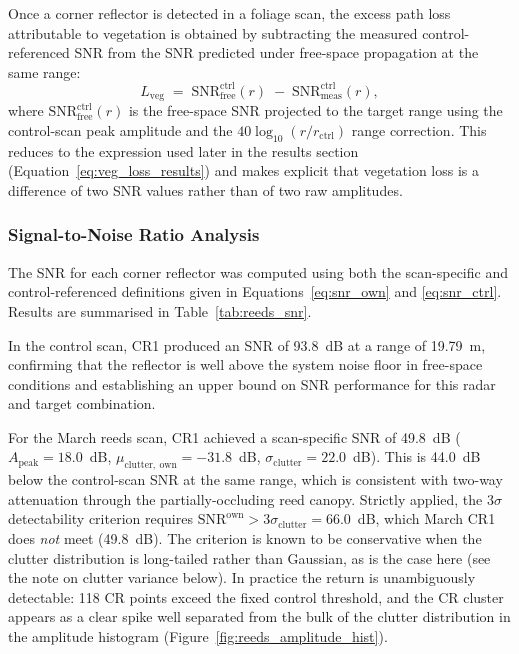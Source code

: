 Once a corner reflector is detected in a foliage scan, the excess path loss
attributable to vegetation is obtained by subtracting the measured
control-referenced SNR from the SNR predicted under free-space propagation at
the same range:
\begin{equation}
    L_{\mathrm{veg}}
    \;=\; \mathrm{SNR}^{\mathrm{ctrl}}_{\mathrm{free}}(r)
          \;-\; \mathrm{SNR}^{\mathrm{ctrl}}_{\mathrm{meas}}(r),
    \label{eq:veg_loss}
\end{equation}
where $\mathrm{SNR}^{\mathrm{ctrl}}_{\mathrm{free}}(r)$ is the free-space SNR
projected to the target range using the control-scan peak amplitude and the
$40\log_{10}(r/r_{\mathrm{ctrl}})$ range correction.
This reduces to the expression used later in the results section
(Equation~\ref{eq:veg_loss_results}) and makes explicit that vegetation loss
is a difference of two SNR values rather than of two raw amplitudes.



\subsubsection{Signal-to-Noise Ratio Analysis}

The SNR for each corner reflector was computed using both the scan-specific
and control-referenced definitions given in
Equations~\ref{eq:snr_own} and \ref{eq:snr_ctrl}.
Results are summarised in Table~\ref{tab:reeds_snr}.

In the control scan, CR1 produced an SNR of 93.8~dB at a range of 19.79~m,
confirming that the reflector is well above the system noise floor in
free-space conditions and establishing an upper bound on SNR performance for
this radar and target combination.

For the March reeds scan, CR1 achieved a scan-specific SNR of 49.8~dB
($A_{\mathrm{peak}} = 18.0$~dB, $\mu_{\mathrm{clutter,\ own}} = -31.8$~dB,
$\sigma_{\mathrm{clutter}} = 22.0$~dB).
This is 44.0~dB below the control-scan SNR at the same range, which is
consistent with two-way attenuation through the partially-occluding reed
canopy.
Strictly applied, the $3\sigma$ detectability criterion requires
$\mathrm{SNR}^{\mathrm{own}} > 3\sigma_{\mathrm{clutter}} = 66.0$~dB, which
March CR1 does \emph{not} meet (49.8~dB).
The criterion is known to be conservative when the clutter distribution is
long-tailed rather than Gaussian, as is the case here (see the note on
clutter variance below).
In practice the return is unambiguously detectable: 118 CR points exceed the
fixed control threshold, and the CR cluster appears as a clear spike well
separated from the bulk of the clutter distribution in the amplitude
histogram (Figure~\ref{fig:reeds_amplitude_hist}).

